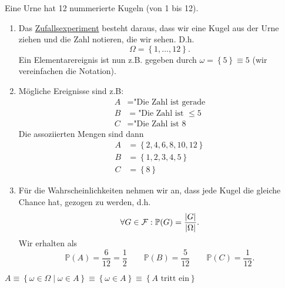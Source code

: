 \begin{example}
    Eine Urne hat 12 nummerierte Kugeln (von 1 bis 12).
    \begin{enumerate}[(1)]
        \item Das \underline{Zufallsexperiment} besteht daraus, dass wir eine Kugel aus der Urne ziehen und die Zahl notieren, die wir sehen. D.h.
            \[
            \Omega = \left \{1,\ldots,12\right\} 
            .\] 
            Ein Elementarereignis ist nun z.B. gegeben durch $ω = \left \{5\right\}  \equiv 5$ (wir vereinfachen die Notation).
        \item Mögliche Ereignisse sind z.B:
            \begin{equation}
                \begin{split}
                    A &= \text{"Die Zahl ist gerade} \\
                    B&= \text{"Die Zahl ist }\leq 5 \\
                    C &= \text{"Die Zahl ist 8}
                \end{split}
            \end{equation}
            Die assoziierten Mengen sind dann
            \begin{equation}
                \begin{split}
                    A &= \left \{2,4,6,8,10,12\right\}  \\
                     B &= \left \{1,2,3,4,5\right\} \\
                      C & = \left \{8\right\} 
                \end{split}
            \end{equation}
        \item Für die Wahrscheinlichkeiten nehmen wir an, dass jede Kugel die gleiche Chance hat, gezogen zu werden, d.h.
            \[
                \forall G\in \mathcal{F}: \mathbb{P}(G) = \frac{\lvert G\rvert}{\lvert\Omega\rvert }
            .\] 
            Wir erhalten als
            \[
                \mathbb{P}(A) = \frac{6}{12}=\frac{1}{2} \qquad \mathbb{P}(B) = \frac{5}{12} \qquad \mathbb{P}(C) = \frac{1}{12}
            .\] 
    \end{enumerate}
\end{example}

\begin{notation}
    $A\equiv \left \{ω\in \Omega \mid  ω\in A\right\} \equiv  \left \{ω\in A\right\} \equiv \left \{A \text{ tritt ein}\right\} $
\end{notation}






